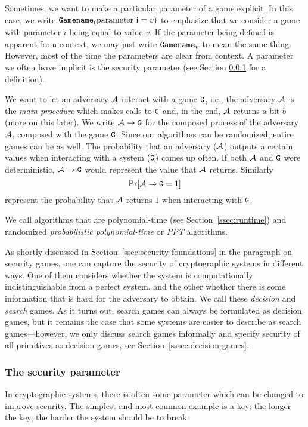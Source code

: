 Sometimes, we want to make a particular parameter of a game explicit. In this case, we write $\text{\texttt{Gamename}}_(\text{parameter i}=v)$ to emphasize that we consider a game with parameter $i$ being equal to value $v$. If the parameter being defined is apparent from context, we may just write $\text{\texttt{Gamename}}_v$ to mean the same thing. However, most of the time the parameters are clear from context. A parameter we often leave implicit is the security parameter (see Section \ref{sssec:security-parameter} for a definition).

We want to let an adversary $\mathcal{A}$ interact with a game $\text{\texttt{G}}$, i.e., the adversary $\mathcal{A}$ is the \emph{main procedure} which makes calls to $\text{\texttt{G}}$ and, in the end, $\mathcal{A}$ returns a bit $b$ (more on this later). We write $\mathcal{A}\rightarrow\text{\texttt{G}}$ for the composed process of the adversary $\mathcal{A}$, composed with the game $\text{\texttt{G}}$.
Since our algorithms can be randomized, entire games can be as well. The probability that an adversary ($\mathcal{A}$) outputs a certain values when interacting with a system ($\text{\texttt{G}}$) comes up often. If both $\mathcal{A}$ and $\text{\texttt{G}}$ were deterministic, $\mathcal{A} \rightarrow \text{\texttt{G}}$ would represent the value that $\mathcal{A}$ returns. Similarly
\[\prob{\adv \circ \M{G} = 1}\]
represent the probability that $\mathcal{A}$ returns $1$ when interacting with $\text{\texttt{G}}$.

We call algorithms that are polynomial-time (see Section~\ref{ssec:runtime}) and randomized \emph{probabilistic polynomial-time} or \emph{PPT} algorithms. 

As shortly discussed in Section~\ref{ssec:security-foundations} in the paragraph on security games, one can capture the security of cryptographic systems in different ways. One of them considers whether the system is computationally indistinguishable from a perfect system, and the other whether there is some information that is hard for the adversary to obtain. We call these \emph{decision} and \emph{search} games. As it turns out, search games can always be formulated as decision games, but it remains the case that some systems are easier to describe as search games---however, we only discuss search games informally and specify security of all primitives as decision games, see Section~\ref{sssec:decision-games}.
 
\subsubsection{The security parameter}\label{sssec:security-parameter}
In cryptographic systems, there is often some parameter which can be changed to improve security. The simplest and most common example is a key: the longer the key, the harder the system should be to break.

